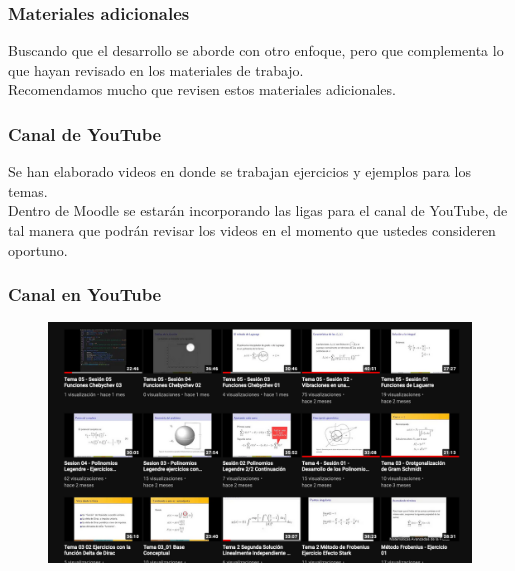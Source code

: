 \begin{frame}
\frametitle{Materiales adicionales}
Buscando que el desarrollo se aborde con otro enfoque, pero que complementa lo que hayan revisado en los materiales de trabajo.
\\
\bigskip
Recomendamos mucho que revisen estos materiales adicionales.
\end{frame}
\begin{frame}
\frametitle{Canal de YouTube}
Se han elaborado videos en donde se trabajan ejercicios y ejemplos para los temas.
\\
\bigskip
\pause
Dentro de Moodle se estarán incorporando las ligas para el canal de YouTube, de tal manera que podrán revisar los videos en el momento que ustedes consideren oportuno.
\end{frame}
\begin{frame}
\frametitle{Canal en YouTube}
\begin{figure}[H]
  \centering
  \includegraphics[scale=0.25]{Imagenes/canal_videos.png}
\end{figure}
\end{frame}
